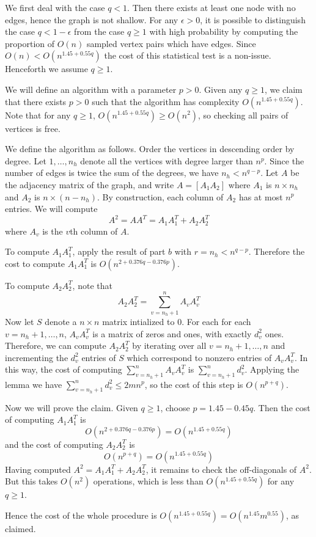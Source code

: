 \documentclass[11pt]{article}
\begin{document}
We first deal with the case $q < 1$.  Then there exists at least one
node with no edges, hence the graph is not shallow.  For any $\epsilon
> 0$, it is possible to distinguish the case $q < 1 - \epsilon$ from
the case $q \geq 1$ with high probability by computing the proportion
of $O(n)$ sampled vertex pairs which have edges.  Since $O(n) <
O(n^{1.45 + 0.55q})$ the cost of this statistical test is a non-issue.
Henceforth we assume $q \geq 1$.

We will define an algorithm with a parameter $p > 0$.  Given any $q
\geq 1$, we claim that there exists $p > 0$ such that the algorithm
has complexity $O(n^{1.45 + 0.55q})$.  Note that for any $q \geq 1$,
$O(n^{1.45 + 0.55q}) \geq O(n^2)$, so checking all pairs of vertices
is free.

We define the algorithm as follows.  Order the vertices in descending
order by degree.  Let $1,\hdots, n_h$ denote all the vertices with
degree larger than $n^p$.  Since the number of edges is twice the sum
of the degrees, we have $n_h < n^{q-p}$.  Let $A$ be the adjacency
matrix of the graph, and write $A = [A_1 A_2]$ where $A_1$ is $n
\times n_h$ and $A_2$ is $n \times (n-n_h)$.  By construction, each
column of $A_2$ has at most $n^p$ entries.  We will compute
\[
A^2 = AA^T = A_1 A_1^T + A_2 A_2^T
\]
where $A_v$ is the $v$th column of $A$.

To compute $A_1 A_1^T$, apply the result of part $b$ with $r = n_h <
n^{q-p}$.  Therefore the cost to compute $A_1 A_1^T$ is
$O(n^{2 +0.376q-0.376p})$.

To compute $A_2 A_2^T$, note that
\[A_2 A_2^T = \sum_{v = n_h + 1}^n A_v A_v^T\]
Now let $S$ denote a $n \times n$ matrix intialized to $0$.  For each
for each $v = n_h+1,\hdots, n$, $A_v A_v^T$ is a matrix of zeros and
ones, with exactly $d_v^2$ ones.  Therefore, we can compute $A_2
A_2^T$ by iterating over all $v = n_h + 1,\hdots, n$ and incrementing
the $d_v^2$ entries of $S$ which correspond to nonzero entries of $A_v
A_v^T$.  In this way, the cost of computing $\sum_{v = n_h + 1}^n A_v
A_v^T$ is $\sum_{v = n_h + 1}^n d_v^2$.  Applying the lemma we have
$\sum_{v = n_h + 1}^n d_v^2 \leq 2 m n^p$, so the cost of this step is
$O(n^{p+q})$.

Now we will prove the claim. Given $q \geq 1$, choose $p = 1.45 - 0.45 q$.
Then the cost of computing $A_1 A_1^T$ is 
\[
O(n^{2 + 0.376q-0.376p}) = O(n^{1.45 + 0.55 q})
\]
and the cost of computing $A_2 A_2^T$ is
\[
O(n^{p + q}) = O(n^{1.45 + 0.55q})
\]
Having computed $A^2 = A_1 A_1^T + A_2 A_2^T$, it remains to check the
off-diagonals of $A^2$.  But this takes $O(n^2)$ operations, which is
less than $O(n^{1.45 + 0.55q})$ for any $q \geq 1$.

Hence the cost of the whole procedure is $O(n^{1.45 + 0.55q}) =
O(n^{1.45} m^{0.55})$, as claimed.
\end{document}
